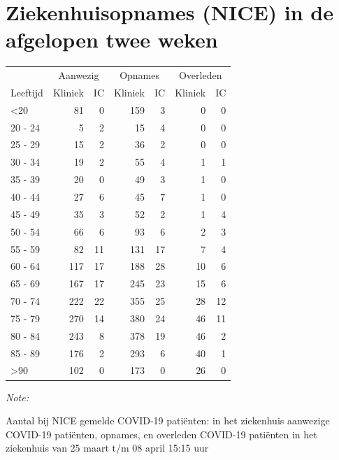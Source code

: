 \documentclass[
  english,
  man,floatsintext]{apa6}
\begin{document}
\newpage

\hypertarget{ziekenhuisopnames-nice-in-de-afgelopen-twee-weken}{%
\section{Ziekenhuisopnames (NICE) in de afgelopen twee weken}\label{ziekenhuisopnames-nice-in-de-afgelopen-twee-weken}}

\begin{table}
\centering\begingroup\fontsize{10}{12}\selectfont

\begin{threeparttable}
\begin{tabular}{lrrrrrr}
\toprule
\multicolumn{1}{c}{ } & \multicolumn{2}{c}{Aanwezig} & \multicolumn{2}{c}{Opnames} & \multicolumn{2}{c}{Overleden} \\
\cmidrule(l{3pt}r{3pt}){2-3} \cmidrule(l{3pt}r{3pt}){4-5} \cmidrule(l{3pt}r{3pt}){6-7}
Leeftijd & Kliniek & IC & Kliniek & IC & Kliniek & IC\\
\midrule
<20 & 81 & 0 & 159 & 3 & 0 & 0\\
20 - 24 & 5 & 2 & 15 & 4 & 0 & 0\\
25 - 29 & 15 & 2 & 36 & 2 & 0 & 0\\
30 - 34 & 19 & 2 & 55 & 4 & 1 & 1\\
35 - 39 & 20 & 0 & 49 & 3 & 1 & 0\\
40 - 44 & 27 & 6 & 45 & 7 & 1 & 0\\
45 - 49 & 35 & 3 & 52 & 2 & 1 & 4\\
50 - 54 & 66 & 6 & 93 & 6 & 2 & 3\\
55 - 59 & 82 & 11 & 131 & 17 & 7 & 4\\
60 - 64 & 117 & 17 & 188 & 28 & 10 & 6\\
65 - 69 & 167 & 17 & 245 & 23 & 15 & 6\\
70 - 74 & 222 & 22 & 355 & 25 & 28 & 12\\
75 - 79 & 270 & 14 & 380 & 24 & 46 & 11\\
80 - 84 & 243 & 8 & 378 & 19 & 46 & 2\\
85 - 89 & 176 & 2 & 293 & 6 & 40 & 1\\
>90 & 102 & 0 & 173 & 0 & 26 & 0\\
\bottomrule
\end{tabular}
\begin{tablenotes}
\item \textit{Note: } 
\item Aantal bij NICE gemelde COVID-19 patiënten: in het ziekenhuis aanwezige COVID-19 patiënten, opnames, en overleden COVID-19 patiënten in het ziekenhuis van 25 maart t/m 08 april 15:15 uur
\end{tablenotes}
\end{threeparttable}
\endgroup{}
\end{table}
\end{document}

